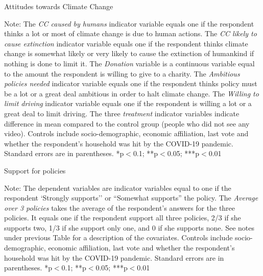 \begin{framefont}{\small}
\begin{frame}{}%
\begin{table}[h!]
\caption{Attitudes towards Climate Change}
\begin{center}
\scalebox{.7}{}
\end{center}
	{\tiny Note: The \textit{CC caused by humans} indicator variable equals one if the respondent thinks a lot or most of climate change is due to human actions. The \textit{CC likely to cause extinction} indicator variable equals one if the respondent thinks climate change is somewhat likely or very likely to cause the extinction of humankind if nothing is done to limit it. The \textit{Donation} variable is a continuous variable equal to the amount the respondent is willing to give to a charity. The \textit{Ambitious policies needed} indicator variable equals one if the respondent thinks policy must be a lot or a great deal ambitious in order to halt climate change. The \textit{Willing to limit driving} indicator variable equals one if the respondent is willing a lot or a great deal to limit driving. The three \textit{treatment} indicator variables indicate difference in mean compared to the control group (people who did not see any video). Controls include socio-demographic, economic affiliation, last vote and whether the respondent's household was hit by the COVID-19 pandemic. Standard errors are in parentheses.  *p$<$0.1; **p$<$0.05; ***p$<$0.01}
\end{table}
\end{frame}

\begin{frame}{}%
\begin{table}[h!]
\caption{Support for policies}
\begin{center}
\scalebox{.7}{}
\end{center}
	{\footnotesize Note: The dependent variables are indicator variables equal to one if the respondent `Strongly supports'' or ``Somewhat supports'' the policy. The \textit{Average over 3 policies} takes the average of the respondent's answers for the three policies. It equals one if the respondent support all three policies, 2/3 if she supports two, 1/3 if she support only one, and 0 if she supports none. See notes under previous Table for a description of the covariates.
	\newline Controls include socio-demographic, economic affiliation, last vote and whether the respondent's household was hit by the COVID-19 pandemic. Standard errors are in parentheses. *p$<$0.1; **p$<$0.05; ***p$<$0.01}
\end{table}
\end{frame}


\end{framefont}
